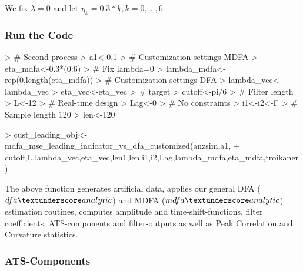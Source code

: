 \documentclass[a4paper]{book}
\begin{document}
We fix $\lambda=0$ and let $\eta_k=0.3*k, k=0,...,6$.

\subsubsection{Run the Code}


\begin{Schunk}
\begin{Sinput}
> # Second process
> a1<-0.1
> # Customization settings MDFA
> eta_mdfa<-0.3*(0:6)
> # Fix lambda=0
> lambda_mdfa<-rep(0,length(eta_mdfa))
> # Customization settings DFA
> lambda_vec<-lambda_vec
> eta_vec<-eta_vec
> # target
> cutoff<-pi/6
> # Filter length
> L<-12
> # Real-time design
> Lag<-0
> # No constraints
> i1<-i2<-F
> # Sample length 120
> len<-120
\end{Sinput}
\end{Schunk}
\begin{Schunk}
\begin{Sinput}
> cust_leading_obj<-mdfa_mse_leading_indicator_vs_dfa_customized(anzsim,a1,
+     cutoff,L,lambda_vec,eta_vec,len1,len,i1,i2,Lag,lambda_mdfa,eta_mdfa,troikaner)  
\end{Sinput}
\end{Schunk}
The above function generates artificial data, applies our general DFA ($dfa\textunderscore analytic$) and MDFA ($mdfa\textunderscore analytic$) estimation routines, computes amplitude and time-shift-functions, filter coefficients, ATS-components and filter-outputs as well as Peak Correlation and Curvature statistics.

\subsubsection{ATS-Components}
\end{document}
